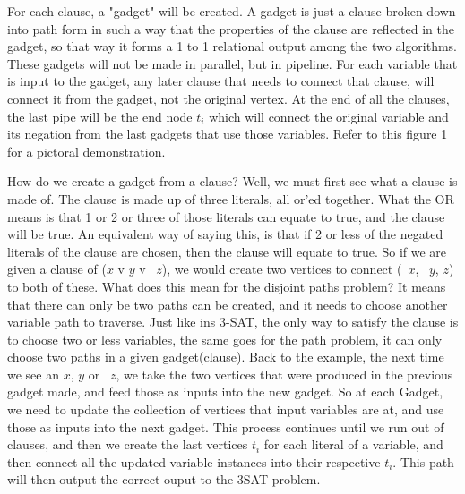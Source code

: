 \documentclass{article}
\begin{document}
\begin{enumerate}
For each clause, a "gadget" will be created. A gadget is just a clause broken down into path form in such a way that the properties of the clause are reflected in the gadget, so that way it forms a 1 to 1 relational output among the two algorithms. These gadgets will not be made in parallel, but in pipeline. For each variable that is input to the gadget, any later clause that needs to connect that clause, will connect it from the gadget, not the original vertex. At the end of all the clauses, the last pipe will be the end node $t_i$ which will connect the original variable and its negation from the last gadgets that use those variables. Refer to this figure 1 for a pictoral demonstration.

How do we create a gadget from a clause? Well, we must first see what a clause is made of. The clause is made up of three literals, all or'ed together. What the OR means is that 1 or 2 or three of those literals can equate to true, and the clause will be true. An equivalent way of saying this, is that if 2 or less of the negated literals of the clause are chosen, then the clause will equate to true. So if we are given a clause of ($x$ v $y$ v ~$z$), we would create two vertices to connect (~$x$, ~$y$, $z$) to both of these. What does this mean for the disjoint paths problem? It means that there can only be two paths can be created, and it needs to choose another variable path to traverse. Just like ins 3-SAT, the only way to satisfy the clause is to choose two or less variables, the same goes for the path problem, it can only choose two paths in a given gadget(clause). Back to the example, the next time we see an $x$, $y$ or ~$z$, we take the two vertices that were produced in the previous gadget made, and feed those as inputs into the new gadget. So at each Gadget, we need to update the collection of vertices that input variables are at, and use those as inputs into the next gadget. This process continues until we run out of clauses, and then we create the last vertices $t_i$ for each literal of a variable, and then connect all the updated variable instances into their respective $t_i$. This path will then output the correct ouput to the 3SAT problem.


\end{enumerate}
\end{document}
